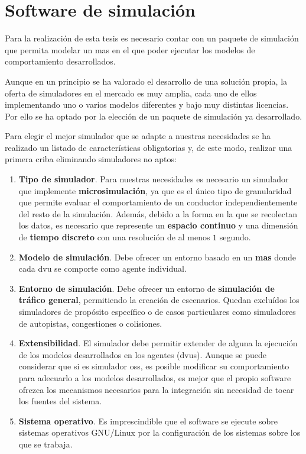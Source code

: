 \section{Software de simulación}

Para la realización de esta tesis es necesario contar con un paquete de simulación que permita modelar un \ac{mas} en el que poder ejecutar los modelos de comportamiento desarrollados.

Aunque en un principio se ha valorado el desarrollo de una solución propia, la oferta de simuladores en el mercado es muy amplia, cada uno de ellos implementando uno o varios modelos diferentes y bajo muy distintas licencias. Por ello se ha optado por la elección de un paquete de simulación ya desarrollado.

Para elegir el mejor simulador que se adapte a nuestras necesidades se ha realizado un listado de características obligatorias y, de este modo, realizar una primera criba eliminando simuladores no aptos:

\begin{enumerate}
	\item \textbf{Tipo de simulador}. Para nuestras necesidades es necesario un simulador que implemente \textbf{microsimulación}, ya que es el único tipo de granularidad que permite evaluar el comportamiento de un conductor independientemente del resto de la simulación. Además, debido a la forma en la que se recolectan los datos, es necesario que represente un \textbf{espacio continuo} y una dimensión de \textbf{tiempo discreto} con una resolución de al menos $1$ segundo.
	\item \textbf{Modelo de simulación}. Debe ofrecer un entorno basado en un \textbf{\ac{mas}} donde cada \ac{dvu} se comporte como agente individual.
	\item \textbf{Entorno de simulación}. Debe ofrecer un entorno de \textbf{simulación de tráfico general}, permitiendo la creación de escenarios. Quedan excluídos los simuladores de propósito específico o de casos particulares como simuladores de autopistas, congestiones o colisiones.
	\item \textbf{Extensibilidad}. El simulador debe permitir extender de alguna la ejecución de los modelos desarrollados en los agentes (\acp{dvu}). Aunque se puede considerar que si es simulador \Ac{oss}, es posible modificar su comportamiento para adecuarlo a los modelos desarrollados, es mejor que el propio software ofrezca los mecanismos necesarios para la integración sin necesidad de tocar los fuentes del sistema.
	\item \textbf{Sistema operativo}. Es imprescindible que el software se ejecute sobre sistemas operativos GNU/Linux por la configuración de los sistemas sobre los que se trabaja.
\end{enumerate}

